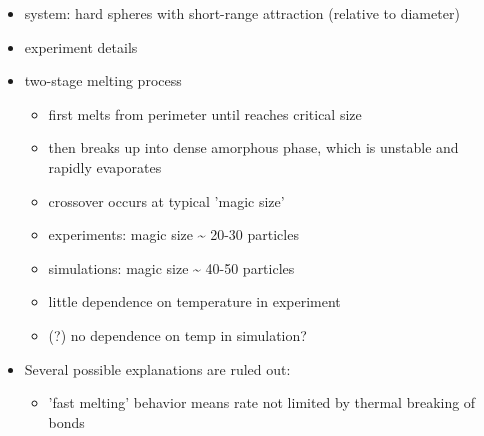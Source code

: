 \documentclass[11pt]{article}
\begin{document}
\begin{itemize}

\item system: hard spheres with short-range attraction (relative to diameter)\\
\label{sec-3.1.2.1}


\item experiment details\\
\label{sec-3.1.2.2}


\item two-stage melting process\\
\label{sec-3.1.2.3}

\begin{itemize}

\item first melts from perimeter until reaches critical size\\
\label{sec-3.1.2.3.1}


\item then breaks up into dense amorphous phase, which is unstable and rapidly evaporates\\
\label{sec-3.1.2.3.2}


\item crossover occurs at typical 'magic size'\\
\label{sec-3.1.2.3.3}


\item experiments: magic size \~{} 20-30 particles\\
\label{sec-3.1.2.3.4}


\item simulations: magic size \~{} 40-50 particles\\
\label{sec-3.1.2.3.5}


\item little dependence on temperature in experiment\\
\label{sec-3.1.2.3.6}


\item (?) no dependence on temp in simulation?\\
\label{sec-3.1.2.3.7}

\end{itemize} %

\item Several possible explanations are ruled out:\\
\label{sec-3.1.2.4}

\begin{itemize}

\item 'fast melting' behavior means rate not limited by thermal breaking of bonds\\
\label{sec-3.1.2.4.1}


\end{itemize}
\end{itemize}
\end{document}
